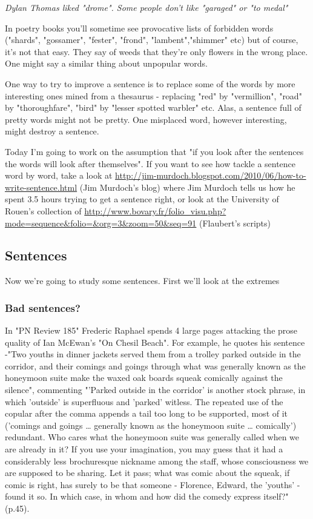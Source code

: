 \documentclass[11pt]{article}
\begin{document}
\textit{Dylan Thomas liked "drome". Some people don't like "garaged" or "to medal"}




In poetry books you'll sometime see provocative lists of forbidden words ("shards", "gossamer", "fester", "frond", "lambent","shimmer" etc) but of course, it's not that easy. They say of weeds that they're only flowers in the wrong place. One might say a similar thing about unpopular words. 




One way to try to improve a sentence is to replace some of the words by more interesting ones mined from a thesaurus - replacing "red" by "vermillion", "road" by "thoroughfare", "bird" by "lesser spotted warbler" etc. Alas, a sentence full of pretty words might not be pretty. One misplaced word, however interesting, might destroy a sentence. 




Today I'm going to work on the assumption that "if you look after the sentences the words will look after themselves". If you want to see how tackle a sentence word by word, take a look at 
 \url{http://jim-murdoch.blogspot.com/2010/06/how-to-write-sentence.html} (Jim Murdoch's blog) where  Jim Murdoch tells us how he spent 3.5 hours trying to get a sentence right, or look at 
the University of Rouen's collection of \url{http://www.bovary.fr/folio_visu.php?mode=sequence&folio=&org=3&zoom=50&seq=91} (Flaubert's scripts)




\subsection*{Sentences}
Now we're going to study some sentences. First we'll look at the extremes


\subsubsection*{Bad sentences?}
In "PN Review 185" Frederic Raphael spends 4 large pages attacking the prose quality of Ian McEwan's "On Chesil Beach". For example, he quotes his sentence -"Two youths in dinner jackets served them from a trolley parked outside in the corridor, and their comings and goings through what was generally known as the honeymoon suite make the waxed oak boards squeak comically against the silence", commenting "'Parked outside in the corridor' is another stock phrase, in which 'outside' is superfluous and 'parked' witless. The repeated use of the copular after the comma appends a  tail too long to be supported, most of it ('comings and goings … generally known as the honeymoon suite … comically') redundant. Who cares what the honeymoon suite was generally called when we are already in it? If you use your imagination, you may guess that it had a considerably less brochuresque nickname among the staff, whose consciousness we are supposed to be sharing. Let it pass; what was comic about the squeak, if comic is right, has surely to be that someone - Florence, Edward, the 'youths' - found it so. In which case, in whom and how did the comedy express itself?" (p.45).
\end{document}
